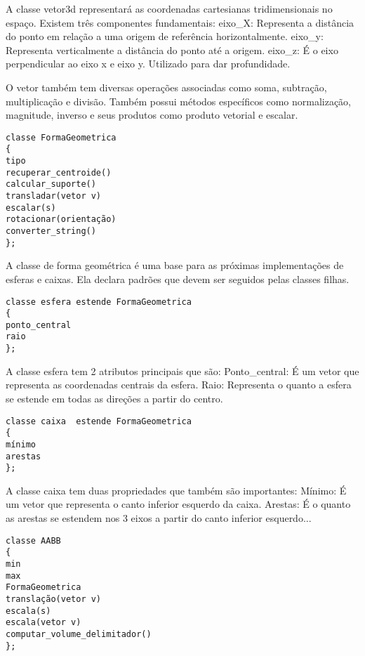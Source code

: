 A classe vetor3d representará as coordenadas cartesianas tridimensionais no espaço.
Existem três componentes fundamentais:
eixo_X: Representa a distância do ponto em relação a uma origem de referência horizontalmente.
eixo_y: Representa verticalmente a distância do ponto até a origem.
eixo_z: É o eixo perpendicular ao eixo x e eixo y. Utilizado para dar profundidade.

O vetor também tem diversas operações associadas como soma, subtração,
multiplicação e divisão. Também possui métodos específicos como normalização,
magnitude, inverso e seus produtos como produto vetorial e escalar.

\begin{lstlisting}[frame=single,caption=Código de exemplo\label{codigo1}]
classe FormaGeometrica
{
tipo
recuperar_centroide()
calcular_suporte()
transladar(vetor v)
escalar(s)
rotacionar(orientação)
converter_string()
};
\end{lstlisting}

A classe de forma geométrica é uma base para as próximas implementações de
esferas e caixas.
Ela declara padrões que devem ser seguidos pelas classes filhas.

\begin{lstlisting}[frame=single,caption=Código de exemplo\label{codigo1}]
classe esfera estende FormaGeometrica
{
ponto_central
raio
};
\end{lstlisting}


A classe esfera tem 2 atributos principais que são:
Ponto_central: É um vetor que representa as coordenadas centrais da esfera.
Raio: Representa o quanto a esfera se estende em todas as direções a partir do
centro.

\begin{lstlisting}[frame=single,caption=Código de exemplo\label{codigo1}]
classe caixa  estende FormaGeometrica
{
mínimo
arestas
};
\end{lstlisting}

A classe caixa tem duas propriedades que também são importantes:
Mínimo: É um vetor que representa o canto inferior esquerdo da caixa.
Arestas: É o quanto as arestas se estendem nos 3 eixos a partir do canto
inferior esquerdo...

\begin{lstlisting}[frame=single,caption=Código de exemplo\label{codigo1}]
classe AABB
{
min
max
FormaGeometrica
translação(vetor v)
escala(s)
escala(vetor v)
computar_volume_delimitador()
};
\end{lstlisting}

